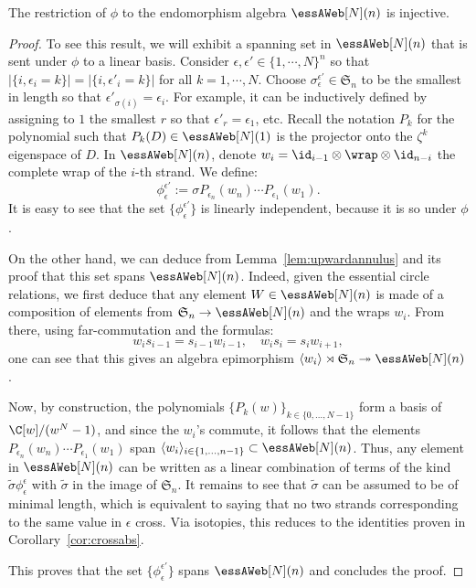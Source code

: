 \begin{prop}\label{prop:faithful} The restriction of $\phi$ to the endomorphism algebra $\essAWeb[N](n)$ is injective.
\end{prop}
\begin{proof}
To see this result, we will exhibit a spanning set in $\essAWeb[N](n)$ that is sent under $\phi$ to a linear basis. Consider $\epsilon,\epsilon'\in \{1,\cdots,N\}^n$ so that $|\{i,\epsilon_i=k\}|=|\{i,\epsilon'_i=k\}|$ for all $k=1,\cdots, N$. Choose $\sigma_\epsilon^{\epsilon'}\in \mathfrak{S}_n$ to be the smallest in length so that $\epsilon'_{\sigma(i)}=\epsilon_i$. For example, it can be inductively defined by assigning to $1$ the smallest $r$ so that $\epsilon'_r=\epsilon_1$, etc. Recall the notation $P_k$ for the polynomial such that $P_k(D)\in \essAWeb[N](1)$ is the projector onto the $\zeta^k$ eigenspace of $D$. In $\essAWeb[N](n)$, denote $w_i=\id_{i-1}\otimes \wrap \otimes \id_{n-i}$ the complete wrap of the $i$-th strand. We define:
  \[
\phi_\epsilon^{\epsilon'}:=\sigma P_{\epsilon_n}(w_n)\cdots P_{\epsilon_1}(w_1).
\]
It is easy to see that the set $\{\phi_\epsilon^{\epsilon'}\}$ is linearly independent, because it is so under $\phi$.

On the other hand, we can deduce from Lemma~\ref{lem:upwardannulus} and its proof that this set spans $\essAWeb[N](n)$. Indeed, given the essential circle relations, we first deduce that any element $W\in \essAWeb[N](n)$ is made of a composition of elements from $\mathfrak{S}_n\rightarrow \essAWeb[N](n)$ and the wraps $w_i$. From there, using far-commutation and the formulas:
\[
w_is_{i-1}=s_{i-1}w_{i-1},\quad w_is_{i}=s_{i}w_{i+1},
\]
one can see that this gives an algebra epimorphism $ \langle w_i\rangle\rtimes \mathfrak{S}_n \twoheadrightarrow \essAWeb[N](n)$.

Now, by construction, the polynomials $\{P_k(w)\}_{k\in \{0,\dots,N-1\}}$ form a basis of $\C[w]/(w^N-1)$, and since the $w_i$'s commute, it follows that the elements $P_{\epsilon_n}(w_n)\cdots P_{\epsilon_1}(w_1)$ span $\langle w_i\rangle_{i\in \{1,\dots,n-1\}}\subset \essAWeb[N](n)$. Thus, any element in $\essAWeb[N](n)$ can be written as a linear combination of terms of the kind $\tilde{\sigma}\phi_{\epsilon}^{\epsilon}$ with $\tilde{\sigma}$ in the image of $\mathfrak{S}_n$. It remains to see that $\tilde{\sigma}$ can be assumed to be of minimal length, which is equivalent to saying that no two strands corresponding to the same value in $\epsilon$ cross.
Via isotopies, this reduces to the identities proven in Corollary~\ref{cor:crossabs}.


This proves that the set $\{\phi_{\epsilon}^{\epsilon'}\}$ spans $\essAWeb[N](n)$ and concludes the proof.
\end{proof}



